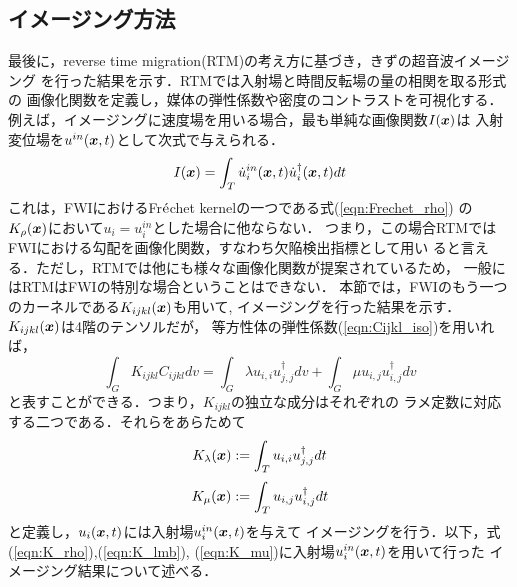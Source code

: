 \subsection{イメージング方法}
最後に，reverse time migration(RTM)の考え方に基づき，きずの超音波イメージング
を行った結果を示す．RTMでは入射場と時間反転場の量の相関を取る形式の
画像化関数を定義し，媒体の弾性係数や密度のコントラストを可視化する．
例えば，イメージングに速度場を用いる場合，最も単純な画像関数$I(\boldsymbol{x})$は
入射変位場を$u^{in}(\boldsymbol{x},t)$として次式で与えられる．
\begin{equation}
	I(\boldsymbol{x})=\int_T \dot u^{in}_i(\boldsymbol{x},t) \dot u_i^{\dagger}(\boldsymbol{x},t)dt
	\label{eqn:Ix}
\end{equation}
これは，FWIにおけるFr$\acute{\rm e}$chet kernelの一つである式(\ref{eqn:Frechet_rho})
の$K_\rho(\boldsymbol{x})$において$u_i=u_i^{in}$とした場合に他ならない．
つまり，この場合RTMではFWIにおける勾配を画像化関数，すなわち欠陥検出指標として用い
ると言える．ただし，RTMでは他にも様々な画像化関数が提案されているため，
一般にはRTMはFWIの特別な場合ということはできない．
本節では，FWIのもう一つのカーネルである$K_{ijkl}(\boldsymbol{x})$も用いて,
イメージングを行った結果を示す．$K_{ijkl}(\boldsymbol{x})$は4階のテンソルだが，
等方性体の弾性係数(\ref{eqn:Cijkl_iso})を用いれば，
\begin{equation}
	\int_G K_{ijkl}C_{ijkl}dv
	=
	\int_G \lambda u_{i,i}u^{\dagger}_{j,j} dv
	+
	\int_G \mu u_{i,j}u^{\dagger}_{i,j} dv
	\label{eqn:}
\end{equation}
と表すことができる．つまり，$K_{ijkl}$の独立な成分はそれぞれの
ラメ定数に対応する二つである．それらをあらためて
\begin{equation}
	K_\lambda(\boldsymbol{x}):= \int_T u_{i,i}u^{\dagger}_{j,j} dt
	\label{eqn:K_lmb}
\end{equation}
\begin{equation}
	K_\mu(\boldsymbol{x}):= \int_T u_{i,j}u^{\dagger}_{i,j} dt
	\label{eqn:K_mu}
\end{equation}
と定義し，$u_i(\boldsymbol{x},t)$には入射場$u_i^{in}(\boldsymbol{x},t)$を与えて
イメージングを行う．以下，式(\ref{eqn:K_rho}),(\ref{eqn:K_lmb}),
(\ref{eqn:K_mu})に入射場$u_i^{in}(\boldsymbol{x},t)$を用いて行った
イメージング結果について述べる．
